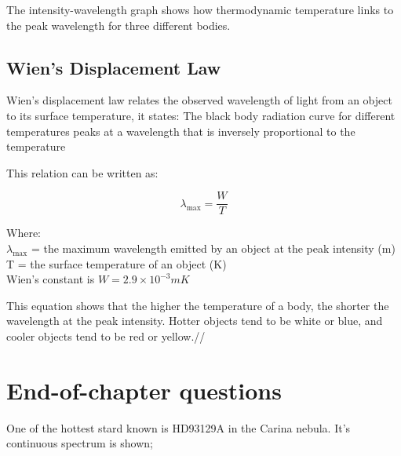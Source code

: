 \documentclass[a4paper,12pt]{book}
\newcounter{question}[chapter]
\begin{document}
The intensity-wavelength graph shows how thermodynamic temperature links to the peak wavelength for three different bodies.

\subsection {Wien's Displacement Law}
Wien’s displacement law relates the observed wavelength of light from an object to its surface temperature, it states:
The black body radiation curve for different temperatures peaks at a wavelength that is inversely proportional to the temperature

This relation can be written as:

\begin{equation*}
    \lambda_{\mathrm{max}}=\frac{W}{T}
\end{equation*}

Where:\\
$\lambda_{\mathrm{max}}$ = the maximum wavelength emitted by an object at the peak intensity (m) \\
T = the surface temperature of an object (K) \\
Wien's constant is $W=2.9\times 10^{-3} mK $

This equation shows that the higher the temperature of a body, the shorter the wavelength at the peak intensity. Hotter objects tend to be white or blue, and cooler objects tend to be red or yellow.//

\section{End-of-chapter questions}

One of the hottest stard known is HD93129A in the Carina nebula. It's continuous spectrum is shown;
\end{document}
